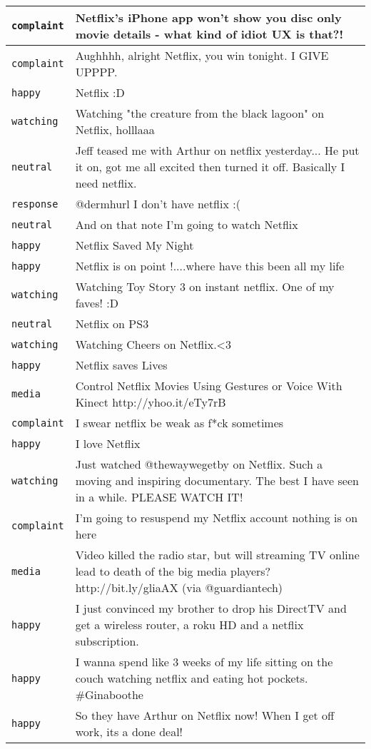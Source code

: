 \begin{center}
\begin{longtable}{|l|p{120mm}|}
      \tabularnewline\hline
         \texttt{complaint} & Netflix's iPhone app won't show you disc only movie details - what kind of idiot UX is that?!
      \tabularnewline\hline
         \texttt{complaint} & Aughhhh, alright Netflix, you win tonight. I GIVE UPPPP.
      \tabularnewline\hline
         \texttt{happy} & Netflix :D
      \tabularnewline\hline
         \texttt{watching} & Watching "the creature from the black lagoon" on Netflix, holllaaa
      \tabularnewline\hline
         \texttt{neutral} & Jeff teased me with Arthur on netflix yesterday... He put it on, got me all excited then turned it off. Basically I need netflix.
      \tabularnewline\hline
         \texttt{response} & @dermhurl I don't have netflix :(
      \tabularnewline\hline
         \texttt{neutral} & And on that note I'm going to watch Netflix
      \tabularnewline\hline
         \texttt{happy} & Netflix Saved My Night
      \tabularnewline\hline
         \texttt{happy} & Netflix is on point !....where have this been all my life
      \tabularnewline\hline
         \texttt{watching} & Watching Toy Story 3 on instant netflix. One of my faves! :D
      \tabularnewline\hline
         \texttt{neutral} & Netflix on PS3
      \tabularnewline\hline
         \texttt{watching} & Watching Cheers on Netflix.<3
      \tabularnewline\hline
         \texttt{happy} & Netflix saves Lives
      \tabularnewline\hline
         \texttt{media} & Control Netflix Movies Using Gestures or Voice With Kinect http://yhoo.it/eTy7rB
      \tabularnewline\hline
         \texttt{complaint} & I swear netflix be weak as f*ck sometimes
      \tabularnewline\hline
         \texttt{happy} & I love Netflix
      \tabularnewline\hline
         \texttt{watching} & Just watched @thewaywegetby on Netflix. Such a moving and inspiring documentary. The best I have seen in a while. PLEASE WATCH IT!
      \tabularnewline\hline
         \texttt{complaint} & I'm going to resuspend my Netflix account nothing is on here
      \tabularnewline\hline
         \texttt{media} & Video killed the radio star, but will streaming TV online lead to death of the big media players? http://bit.ly/gliaAX (via @guardiantech)
      \tabularnewline\hline
         \texttt{happy} & I just convinced my brother to drop his DirectTV and get a wireless router, a roku HD and a netflix subscription.
      \tabularnewline\hline
         \texttt{happy} & I wanna spend like 3 weeks of my life sitting on the couch watching netflix and eating hot pockets. \#Ginaboothe
      \tabularnewline\hline
         \texttt{happy} & So they have Arthur on Netflix now! When I get off work, its a done deal!

\end{longtable}
\end{center}
